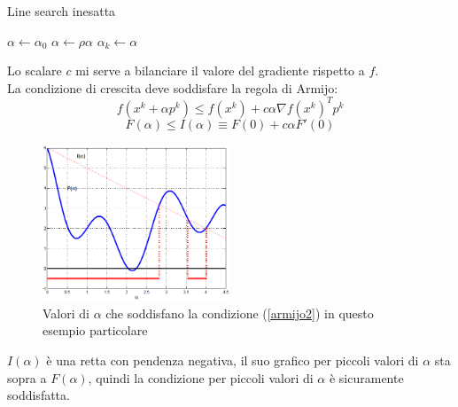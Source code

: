 \documentclass{report}
\begin{document}
\begin{algorithm}
\caption{Line search inesatta}\label{alg:euclid}
\begin{algorithmic}[1]
\State $\alpha \gets \alpha_0$
\State $\alpha \gets \rho\alpha$
\EndWhile
\State $\alpha_k \gets \alpha$
\EndProcedure
\end{algorithmic}
\end{algorithm}
Lo scalare $c$ mi serve a bilanciare il valore del gradiente rispetto a $f$.\\
La condizione di crescita deve soddisfare la regola di Armijo:
\begin{equation}
    \label{armijo1}
    f(x^k + \alpha p^k) \leqslant f(x^k) + c \alpha \nabla f(x^k)^T p^k
\end{equation}
\begin{equation}
    \label{armijo2}
         F( \alpha ) \leqslant I( \alpha ) \equiv F( 0 ) + c \alpha F'(0 )
\end{equation}
\begin{figure}[H]
  	\centering
	\includegraphics[width=0.5\textwidth]{Immagine_1}
    	\caption{Valori di $\alpha$ che soddisfano la condizione (\ref{armijo2}) in questo esempio particolare}
\end{figure}
$I( \alpha )$ è una retta con pendenza negativa, il suo grafico per piccoli valori di $\alpha$ sta sopra a $F( \alpha )$, quindi la condizione per piccoli valori di $\alpha$ è sicuramente soddisfatta.
\end{document}
